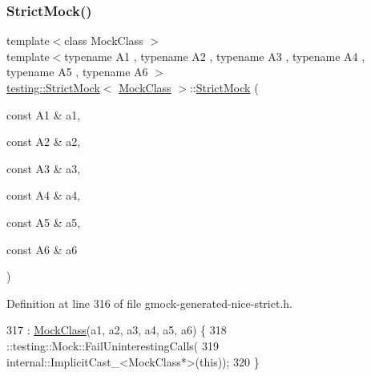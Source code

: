 \subsubsection{\texorpdfstring{Strict\+Mock()}{StrictMock()}\hspace{0.1cm}{\footnotesize\ttfamily [7/11]}}
{\footnotesize\ttfamily template$<$class Mock\+Class $>$ \\
template$<$typename A1 , typename A2 , typename A3 , typename A4 , typename A5 , typename A6 $>$ \\
\hyperlink{classtesting_1_1StrictMock}{testing\+::\+Strict\+Mock}$<$ \hyperlink{classMockClass}{Mock\+Class} $>$\+::\hyperlink{classtesting_1_1StrictMock}{Strict\+Mock} (\begin{DoxyParamCaption}\item[{const A1 \&}]{a1,  }\item[{const A2 \&}]{a2,  }\item[{const A3 \&}]{a3,  }\item[{const A4 \&}]{a4,  }\item[{const A5 \&}]{a5,  }\item[{const A6 \&}]{a6 }\end{DoxyParamCaption})\hspace{0.3cm}{\ttfamily [inline]}}



Definition at line 316 of file gmock-\/generated-\/nice-\/strict.\+h.


\begin{DoxyCode}
317                                   : \hyperlink{classMockClass}{MockClass}(a1, a2, a3, a4, a5, a6) \{
318     ::testing::Mock::FailUninterestingCalls(
319         internal::ImplicitCast\_<MockClass*>(\textcolor{keyword}{this}));
320   \}
\end{DoxyCode}
\mbox{\label{classtesting_1_1StrictMock_a4af48752fc22815250369292b9c064bc}} 
